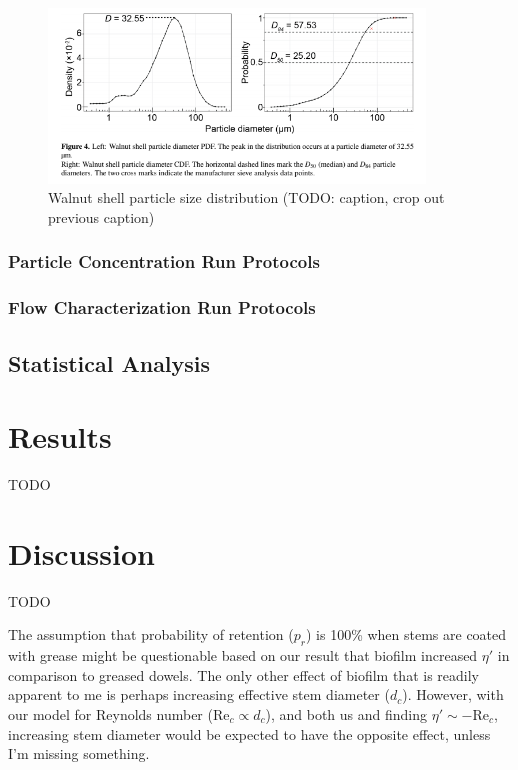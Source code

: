 \documentclass[parskip=full-]{scrreprt}
\newcommand\Rey{\mathrm{Re}}
\begin{document}
\begin{figure}[htbp]
\includegraphics[width=10cm]{wf5-200sizedist.png}
\centering
\caption{Walnut shell particle size distribution (TODO: caption, crop out previous caption)}
\end{figure}

\subsection{Particle Concentration Run Protocols}

\subsection{Flow Characterization Run Protocols}

\section{Statistical Analysis}

\chapter{Results}

TODO

\chapter{Discussion}

TODO

The assumption that probability of retention (\(p_r\)) is 100\% when stems are coated with grease might be questionable based on our result that biofilm increased \(\eta\prime\) in comparison to greased dowels. The only other effect of biofilm that is readily apparent to me is perhaps increasing effective stem diameter (\(d_c\)). However, with our model for Reynolds number (\(\Rey_c \propto d_c\)), and both us and \citet{Fauria_2015} finding \(\eta\prime \sim -\Rey_c\), increasing stem diameter would be expected to have the opposite effect, unless I'm missing something.



\end{document}
